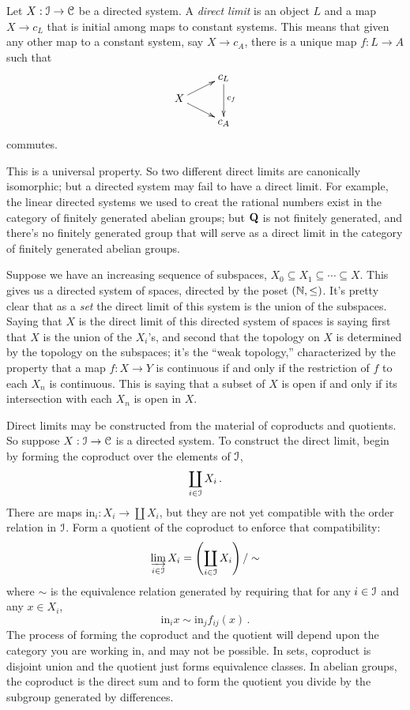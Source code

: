 \begin{definition}
Let $X:\mathcal I\to\mathcal C$ be a directed system.
A {\em direct limit} is an object $L$ and a map $X\to c_L$ that is initial among maps to constant systems. This means that given any other map to a constant system, say $X\to c_A$, there is a unique map $f:L\to A$ such that 
\[
\xymatrix@R=8pt{
& c_L \ar[dd]^{c_f} \\
X \ar[ur] \ar[dr] \\
& c_A
}\]
commutes.
\end{definition}
This is a universal property. So two different direct limits are canonically isomorphic; but a directed system may fail to have a direct limit. For example, the linear directed systems we used to creat the rational numbers exist in the category of finitely generated abelian groups; but $\mathbf Q$ is not finitely generated, and there's no finitely generated group that will serve as a direct limit in the category of finitely generated abelian groups. 
\begin{example}
Suppose we have an increasing sequence of subspaces, 
$X_0\subseteq X_1\subseteq\cdots\subseteq X$. This gives us a directed system
of spaces, directed by the poset $(\mathbb N,\leq)$. It's pretty clear that as a 
{\em set} the direct limit of this system is the union of the subspaces. 
Saying that $X$ is the direct limit of this directed system of spaces is 
saying first that $X$ is the union of the $X_i$'s, and second 
that the topology on $X$ is determined
by the topology on the subspaces; it's the ``weak topology,'' characterized
by the property that a map $f:X\to Y$ is continuous if and only if the 
restriction of $f$ to each $X_n$ is continuous. This is saying that a subset 
of $X$ is open if and only if its intersection with each $X_n$ is open in $X$.
\end{example}
Direct limits may be constructed from the material of coproducts and quotients. So suppose $X:\mathcal I\to\mathcal C$ is a directed system. To construct the direct limit, begin by forming the coproduct over the elements of $\mathcal I$,
\[
\coprod_{i\in\mathcal I}X_i\,.
\]
There are maps $\mathrm{in}_i:X_i\to\coprod X_i$, but they are not yet compatible with the order relation in $\mathcal I$. Form a quotient of the coproduct to enforce that compatibility: 
\[
\varinjlim_{i\in\mathcal I}X_i=\left(\coprod_{i\in\mathcal I}X_i\right)/\sim
\]
where $\sim$ is the equivalence relation generated by requiring that 
for any $i\in\mathcal I$ and any $x\in X_i$, 
\[
\mathrm{in}_ix\sim\mathrm{in}_j f_{ij}(x)\,.
\]
The process of forming the coproduct and the quotient will depend upon the 
category you are working in, and may not be possible. 
In sets, coproduct is disjoint union and the
quotient just forms equivalence classes. In abelian groups, the coproduct
is the direct sum and to form the quotient you divide by the subgroup 
generated by differences. 


